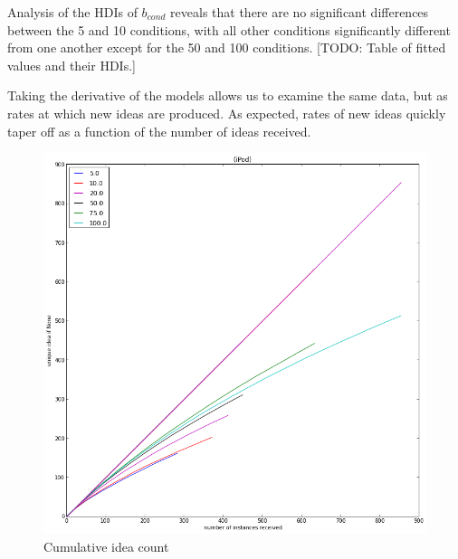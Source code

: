 Analysis of the HDIs of $b_{cond}$ reveals that there are no significant differences between the 5 and 10 conditions, with all other conditions significantly different from one another except for the 50 and 100 conditions. [TODO: Table of fitted values and their HDIs.]

Taking the derivative of the models allows us to examine the same data, but as rates at which new ideas are produced. As expected, rates of new ideas quickly taper off as a function of the number of ideas received.

\begin{figure}[h!]
    \centering
    \includegraphics[width=0.9\columnwidth]{ideas_over_time}
    \caption{Cumulative idea count}
\end{figure}

